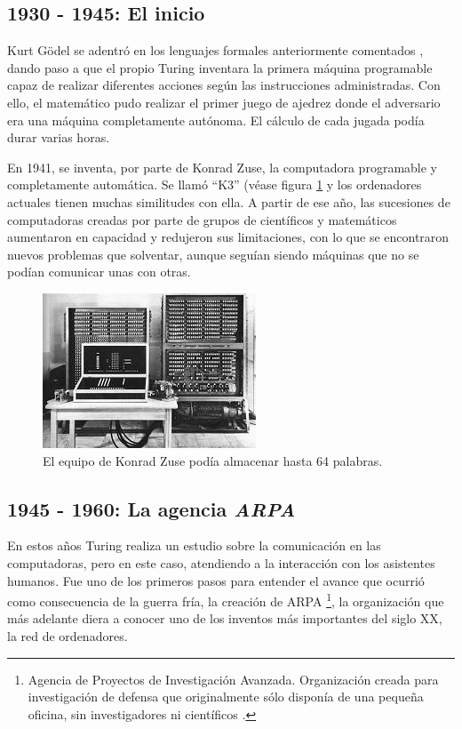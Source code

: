 \subsection{1930 - 1945: El inicio}
Kurt Gödel se adentró en los lenguajes formales anteriormente comentados 
\cite{OxfordReference}, dando paso a que el propio Turing inventara la primera 
máquina programable capaz de realizar diferentes acciones 
según las instrucciones administradas. Con ello, el matemático pudo realizar 
el primer juego de ajedrez donde el adversario era una máquina 
completamente autónoma. El cálculo de cada jugada podía durar varias 
horas.

En 1941, se inventa, por parte de Konrad Zuse, la computadora 
programable y completamente automática. Se llamó ``K3'' (véase 
figura \ref{fig:z3} y los ordenadores actuales tienen muchas 
similitudes con ella. A partir de ese año, las sucesiones de 
computadoras creadas por parte de grupos de científicos 
y matemáticos aumentaron en capacidad y redujeron sus limitaciones, 
con lo que se encontraron nuevos problemas que solventar, aunque 
seguían siendo máquinas que no se podían comunicar unas con otras.

\begin{figure}[h]
	\centering
	\includegraphics[scale=2]{images/z3.png}
	\caption[El ordenador ``K3'']{El equipo de Konrad Zuse podía almacenar hasta 64 palabras.}
	\label{fig:z3}
\end{figure}


\subsection{1945 - 1960: La agencia \emph{ARPA} }
En estos años Turing realiza un estudio sobre la comunicación en 
las computadoras, pero en este caso, atendiendo a la interacción con 
los asistentes humanos. Fue uno de los primeros pasos para entender el 
avance que ocurrió como consecuencia de la guerra fría, la creación 
de ARPA \footnote{Agencia de Proyectos de Investigación Avanzada. 
Organización creada para investigación de defensa que originalmente 
sólo disponía de una pequeña oficina, sin investigadores ni 
científicos \cite{Tanenbaum}.}, la organización que más adelante 
diera a conocer uno de los inventos más importantes del siglo XX, la 
red de ordenadores.

